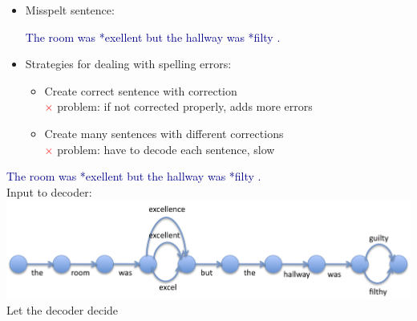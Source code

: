 \documentclass[landscape]{uedslides2C}
\newcommand{\example}[1]{\textcolor{darkblue}{\rm #1}}
\begin{document}

\vspace{10mm}
\begin{itemize}
\item Misspelt sentence: 
\begin{center}
\example{The room was *exellent but the hallway was *filty .}
\end{center}
\item Strategies for dealing with spelling errors:
\begin{itemize} \itemsep 7mm
  \item Create correct sentence with correction \\
  		\textcolor{red}{$\times$}  problem: if not corrected properly, adds more errors  
  \item Create many sentences with different corrections \\
  		\textcolor{red}{$\times$} problem: have to decode each sentence, slow
		\end{itemize}
\end{itemize}


\vspace{10mm}
\begin{center}
\example{The room was *exellent but the hallway was *filty .}\\[10mm]
Input to decoder:\\[10mm]
\includegraphics[scale=0.9]{confusion-network.png}\\[5mm]
Let the decoder decide
\end{center}
\end{document}
